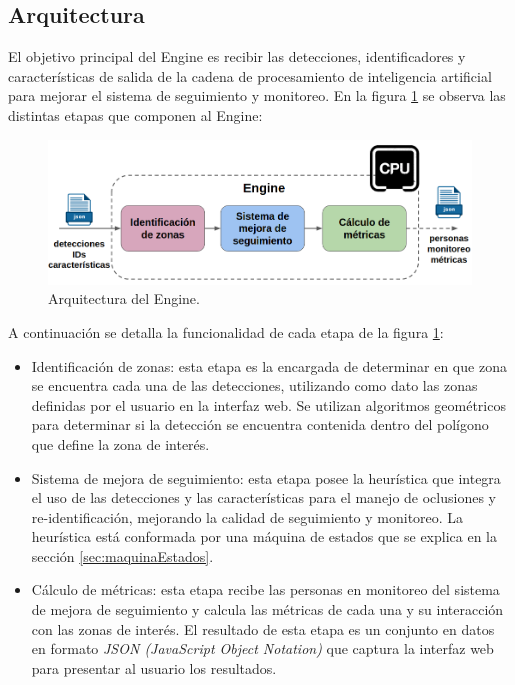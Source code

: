 \subsection{Arquitectura}

El objetivo principal del Engine es recibir las detecciones, identificadores y características de salida de la cadena de procesamiento de inteligencia artificial para mejorar el sistema de seguimiento y monitoreo. En la figura \ref{fig:arquitecturaEngine} se observa las distintas etapas que componen al Engine:

\begin{figure}[ht]
	\centering
	\includegraphics[scale=.5]{./Figures/arquitecturaEngine.png}
	\caption{Arquitectura del Engine.}
	\label{fig:arquitecturaEngine}
\end{figure}

A continuación se detalla la funcionalidad de cada etapa de la figura \ref{fig:arquitecturaEngine}:
\begin{itemize}
\item Identificación de zonas: esta etapa es la encargada de determinar en que zona se encuentra cada una de las detecciones, utilizando como dato las zonas definidas por el usuario en la interfaz web. Se utilizan algoritmos geométricos \citep{POLYGON_TEST_INSIDE} para determinar si la detección se encuentra contenida dentro del polígono que define la zona de interés.
\item Sistema de mejora de seguimiento: esta etapa posee la heurística que integra el uso de las detecciones y las características para el manejo de oclusiones y re-identificación, mejorando la calidad de seguimiento y monitoreo. La heurística está conformada por una máquina de estados que se explica en la sección \ref{sec:maquinaEstados}.
\item Cálculo de métricas: esta etapa recibe las personas en monitoreo del sistema de mejora de seguimiento y calcula las métricas de cada una y su interacción con las zonas de interés. El resultado de esta etapa es un conjunto en datos en formato \textit{JSON (JavaScript Object Notation)} que captura la interfaz web para presentar al usuario los resultados.
\end{itemize}

